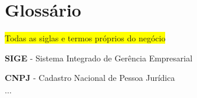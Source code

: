 \section{Glossário}

\colorbox{yellow}{Todas as siglas e termos próprios do negócio}



\noindent\textbf{SIGE} - Sistema Integrado de Gerência Empresarial

\noindent\textbf{CNPJ} - Cadastro Nacional de Pessoa Jurídica

\noindent$\dots$